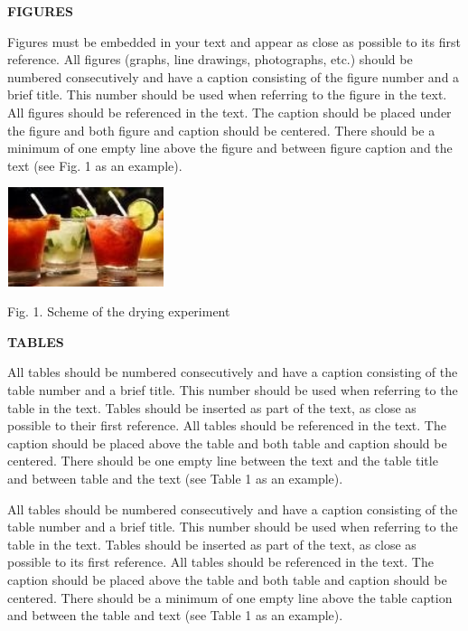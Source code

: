\documentclass[conference,compsoc]{IEEEtran}
\begin{document}
\textbf{FIGURES}

Figures must be embedded in your text and appear as close as possible to its first reference. All figures (graphs, line drawings, photographs, etc.) should be numbered consecutively and have a caption consisting of the figure number and a brief title. This number should be used when referring to the figure in the text. All figures should be referenced in the text. The caption should be placed under the figure and both figure and caption should be centered. There should be a minimum of one empty line above the figure and between figure caption and the text (see Fig. 1 as an example).
\begin{center}
\includegraphics[width=130pt, height=82pt, keepaspectratio=true]{f1.jpg}

Fig. 1. Scheme of the drying experiment
\end{center}


\textbf{TABLES}

All tables should be numbered consecutively and have a caption consisting of the table number and a brief title. This number should be used when referring to the table in the text. Tables should be inserted as part of the text, as close as possible to their first reference. All tables should be referenced in the text. The caption should be placed above the table and both table and caption should be centered. There should be one empty line between the text and the table title and between table and the text (see Table 1 as an example).

All tables should be numbered consecutively and have a caption consisting of the table number and a brief title. This number should be used when referring to the table in the text. Tables should be inserted as part of the text, as close as possible to its first reference. All tables should be referenced in the text. The caption should be placed above the table and both table and caption should be centered. There should be a minimum of one empty line above the table caption and between the table and text (see Table 1 as an example).
\end{document}
